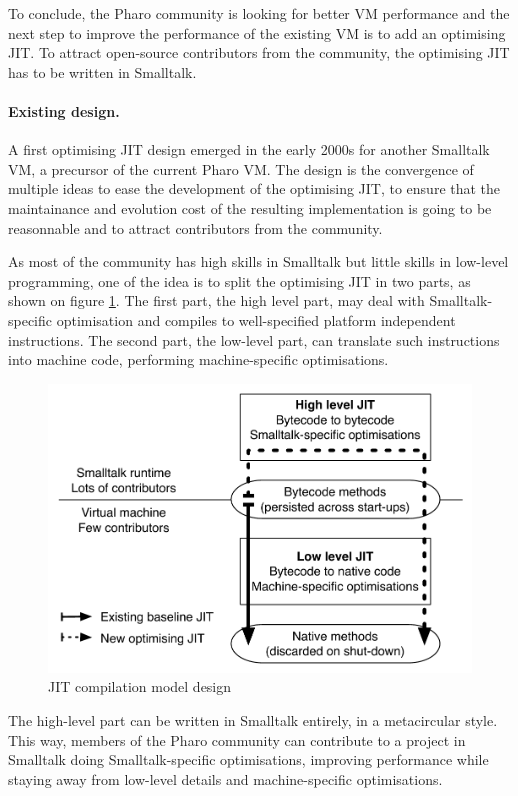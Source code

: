 \documentclass[a4paper,12pt,twoside]{../includes/ThesisStyle}
\begin{document}
To conclude, the Pharo community is looking for better VM performance and the next step to improve the performance of the existing VM is to add an optimising JIT. To attract open-source contributors from the community, the optimising JIT has to be written in Smalltalk.

\paragraph{Existing design.}

A first optimising JIT design emerged in the early 2000s for another Smalltalk VM, a precursor of the current Pharo VM. The design is the convergence of multiple ideas to ease the development of the optimising JIT, to ensure that the maintainance and evolution cost of the resulting implementation is going to be reasonnable and to attract contributors from the community.

As most of the community has high skills in Smalltalk but little skills in low-level programming, one of the idea is to split the optimising JIT in two parts, as shown on figure \ref{fig:ExistingDesign}. The first part, the high level part, may deal with Smalltalk-specific optimisation and compiles to well-specified platform independent instructions. The second part, the low-level part, can translate such instructions into machine code, performing machine-specific optimisations.

\begin{figure}[h!]
    \begin{center}
        \includegraphics[width=0.8\linewidth]{ExistingDesign}
        \caption{JIT compilation model design}
        \label{fig:ExistingDesign}
    \end{center}
\end{figure}

The high-level part can be written in Smalltalk entirely, in a metacircular style. This way, members of the Pharo community can contribute to a project in Smalltalk doing Smalltalk-specific optimisations, improving performance while staying away from low-level details and machine-specific optimisations. 
\end{document}
